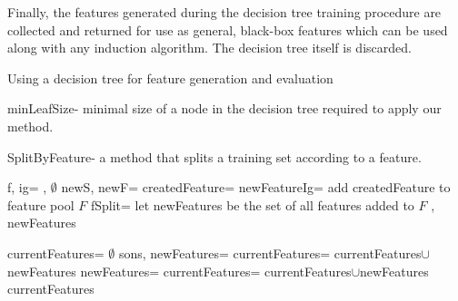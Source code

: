 \documentclass[twoside,11pt]{article}
\theoremstyle{definition}
\begin{document}
Finally, the features generated during the decision tree training procedure are collected and returned for use as general, black-box features which can be used along with any induction algorithm. The decision tree itself is discarded.

\begin{algorithm}[H]
	\caption{Using a decision tree for feature generation and evaluation}
	\label{code-tree-thing}
	\small
		minLeafSize- minimal size of a node in the decision tree required to apply our method.

        SplitByFeature- a method that splits a training set according to a feature.
        
		\begin{algorithmic}
                \State f, ig=  
                 
                    \State
                    \Return {}, $\emptyset$
                \EndIf
                    \State newS, newF= 
                    \State createdFeature=  
                    \State newFeatureIg= 
                        \State add createdFeature to feature pool $F$
                    \EndIf
                \EndFor
                \State fSplit=  
                \State let newFeatures be the set of all features added to $F$
                \State \Return {}, newFeatures
			\EndFunction

            			

                \State currentFeatures= $\emptyset$
                \State sons, newFeatures=
                \State currentFeatures= currentFeatures$\cup$newFeatures
                 
                    \State newFeatures=
                    \State currentFeatures= currentFeatures$\cup$newFeatures
                \EndFor
                \State \Return currentFeatures
			\EndFunction
		\end{algorithmic}
	\end{algorithm}
\end{document}
